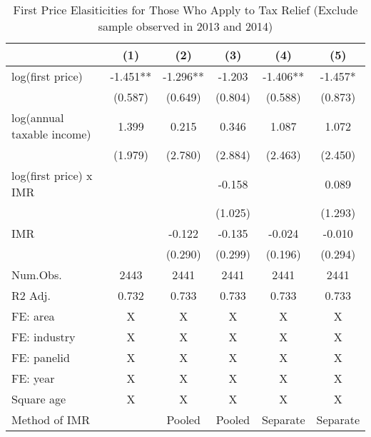 \documentclass[
  11pt,
  a4paper,
]{article}
\begin{document}
\begin{table}

\caption{\label{tab:robustbenchmark1}First Price Elasiticities for Those Who Apply to Tax Relief (Exclude sample observed in 2013 and 2014)}
\centering
\begin{tabular}[t]{lccccc}
\toprule
  & (1) & (2) & (3) & (4) & (5)\\
\midrule
log(first price) & -1.451** & -1.296** & -1.203 & -1.406** & -1.457*\\
 & (0.587) & (0.649) & (0.804) & (0.588) & (0.873)\\
log(annual taxable income) & 1.399 & 0.215 & 0.346 & 1.087 & 1.072\\
 & (1.979) & (2.780) & (2.884) & (2.463) & (2.450)\\
log(first price) x IMR &  &  & -0.158 &  & 0.089\\
 &  &  & (1.025) &  & (1.293)\\
IMR &  & -0.122 & -0.135 & -0.024 & -0.010\\
 &  & (0.290) & (0.299) & (0.196) & (0.294)\\
\midrule
Num.Obs. & 2443 & 2441 & 2441 & 2441 & 2441\\
R2 Adj. & 0.732 & 0.733 & 0.733 & 0.733 & 0.733\\
FE: area & X & X & X & X & X\\
FE: industry & X & X & X & X & X\\
FE: panelid & X & X & X & X & X\\
FE: year & X & X & X & X & X\\
Square age & X & X & X & X & X\\
Method of IMR &  & Pooled & Pooled & Separate & Separate\\
\bottomrule
\end{tabular}
\end{table}
\end{document}
